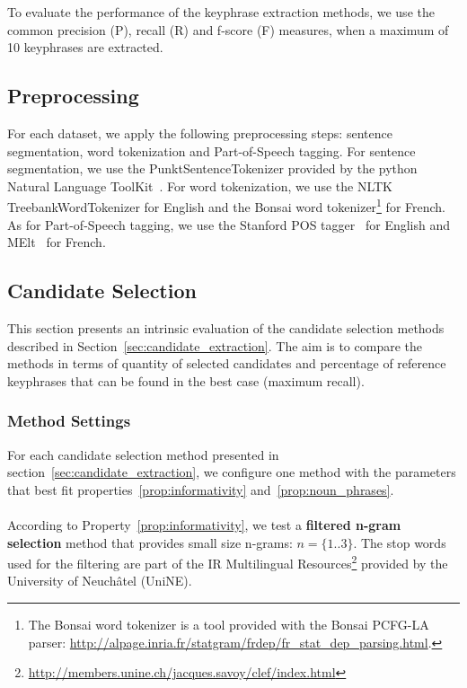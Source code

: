     To evaluate the performance of the keyphrase extraction methods, we use
    the common precision (P), recall (R) and f-score (F) measures, when a
    maximum of 10 keyphrases are extracted.

  \subsection{Preprocessing}
  \label{subsec:preprocessing}
    For each dataset, we apply the following preprocessing steps: sentence
    segmentation, word tokenization and Part-of-Speech tagging. For sentence
    segmentation, we use the PunktSentenceTokenizer provided by the python
    Natural Language ToolKit~\cite{bird2009nltk}. For word tokenization, we
    use the NLTK TreebankWordTokenizer for English and the Bonsai word
    tokenizer\footnote{The Bonsai word tokenizer is a tool provided with the
    Bonsai PCFG-LA parser:
    \url{http://alpage.inria.fr/statgram/frdep/fr_stat_dep_parsing.html}.} for
    French. As for Part-of-Speech tagging, we use the Stanford
    POS tagger~\cite{toutanova2003stanfordpostagger} for English and
    MElt~\cite{denis2009melt} for French.

  \subsection{Candidate Selection}
  \label{subsec:candidate_extraction}

    This section presents an intrinsic evaluation of the candidate selection
    methods described in Section~\ref{sec:candidate_extraction}. The aim is to
    compare the methods in terms of quantity of selected candidates and
    percentage of reference keyphrases that can be found in the best case
    (maximum recall).

    \subsubsection{Method Settings}
    \label{subsubsec:method_settings}
      For each candidate selection method presented in
      section~\ref{sec:candidate_extraction}, we configure one method with the
      parameters that best fit properties~\ref{prop:informativity}
      and~\ref{prop:noun_phrases}.

      \paragraph{}
      According to Property~\ref{prop:informativity}, we test a \textbf{filtered
      n-gram selection} method that provides small size n-grams:
      $n = \{1..3\}$. The stop words used for the filtering are part of the IR
      Multilingual
      Resources\footnote{\url{http://members.unine.ch/jacques.savoy/clef/index.html}}
      provided by the University of Neuchâtel (UniNE).

